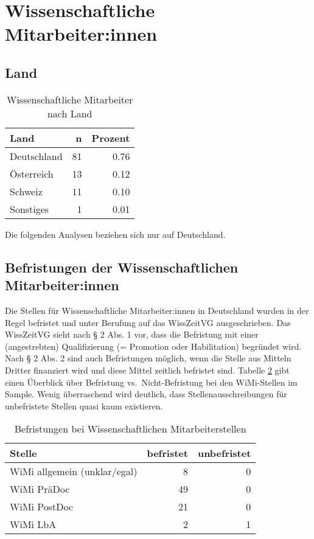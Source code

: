 \documentclass[
]{article}
\begin{document}
\hypertarget{wissenschaftliche-mitarbeiterinnen}{%
\section{Wissenschaftliche Mitarbeiter:innen}\label{wissenschaftliche-mitarbeiterinnen}}

\hypertarget{land}{%
\subsection{Land}\label{land}}

\begin{table}[H]

\caption{\label{tab:unnamed-chunk-1}Wissenschaftliche Mitarbeiter nach Land}
\centering
\begin{tabular}[t]{l|r|r}
\hline
Land & n & Prozent\\
\hline
Deutschland & 81 & 0.76\\
\hline
Österreich & 13 & 0.12\\
\hline
Schweiz & 11 & 0.10\\
\hline
Sonstiges & 1 & 0.01\\
\hline
\end{tabular}
\end{table}

Die folgenden Analysen beziehen sich nur auf Deutschland.

\hypertarget{befristungen-der-wissenschaftlichen-mitarbeiterinnen}{%
\subsection{Befristungen der Wissenschaftlichen Mitarbeiter:innen}\label{befristungen-der-wissenschaftlichen-mitarbeiterinnen}}

Die Stellen für Wissenschaftliche Mitarbeiter:innen in Deutschland wurden in der Regel befristet und unter Berufung auf das WissZeitVG ausgeschrieben. Das WissZeitVG sieht nach § 2 Abs. 1 vor, dass die Befristung mit einer (angestrebten) Qualifizierung (= Promotion oder Habilitation) begründet wird. Nach § 2 Abs. 2 sind auch Befristungen möglich, wenn die Stelle aus Mitteln Dritter finanziert wird und diese Mittel zeitlich befristet sind. Tabelle \ref{tab:limits} gibt einen Überblick über Befristung vs.~Nicht-Befristung bei den WiMi-Stellen im Sample. Wenig überraschend wird deutlich, dass Stellenausschreibungen für unbefristete Stellen quasi kaum existieren.

\begin{table}[H]

\caption{\label{tab:limits}Befristungen bei Wissenschaftlichen Mitarbeiterstellen}
\centering
\begin{tabular}[t]{l|r|r}
\hline
Stelle & befristet & unbefristet\\
\hline
WiMi allgemein (unklar/egal) & 8 & 0\\
\hline
WiMi PräDoc & 49 & 0\\
\hline
WiMi PostDoc & 21 & 0\\
\hline
WiMi LbA & 2 & 1\\
\hline
\end{tabular}
\end{table}
\end{document}
